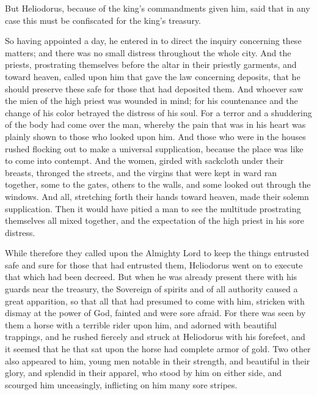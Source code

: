 {But
 Heliodorus, because of the king’s commandments given him, said that in any case this
{} must be confiscated for the king’s treasury.
\par }{\PP {}So having appointed a day, he entered in to direct the inquiry concerning these matters; and there was no small distress throughout the whole city.
And the priests, prostrating themselves before the altar in their priestly garments, and
{} toward heaven, called upon him that gave the law concerning deposits, that he should preserve these
{} safe for those that had deposited them.
And whoever saw the mien of the high priest was wounded in mind; for his countenance and the change of his color betrayed the distress of his soul.
For a terror and a shuddering of the body had come over the man, whereby the pain that was in his heart was plainly shown to those who looked upon him.
And those who were in the houses rushed flocking out to make a universal supplication, because the place was like to come into contempt.
And the women, girded with sackcloth under their breasts, thronged the streets, and the virgins that were kept in ward ran together, some to the
 gates, others to the walls, and some looked out through the windows.
And all, stretching forth their hands toward heaven, made their solemn supplication.
Then it would have pitied a man to see the multitude prostrating themselves all mixed together, and the expectation of the high priest in his sore distress.
\par }{\PP {}While therefore they called upon the Almighty Lord to keep the things entrusted
{}
 safe and sure for those that had entrusted them,
Heliodorus went on to execute that which had been decreed.
But when he was already present there with his guards near the treasury, the Sovereign of spirits and of all authority caused a great
 apparition, so that all that had presumed to come
{} with him, stricken with dismay at the power of God, fainted and were sore afraid.
For there was seen by them a horse with a terrible rider upon him, and adorned with beautiful trappings, and he rushed fiercely and struck at Heliodorus with his forefeet, and it seemed that he that sat upon the horse had complete armor of gold.
Two other also appeared to him, young men notable in their strength, and beautiful in their glory, and splendid in their apparel, who stood by him on either side, and scourged him unceasingly, inflicting on him many sore stripes.
}
